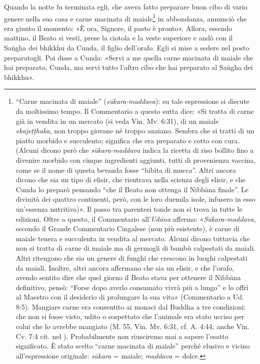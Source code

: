 Quando la notte fu terminata egli, che aveva fatto preparare buon cibo di vario
genere nella sua casa e carne macinata di maiale\footnote{“Carne macinata di
  maiale” (\emph{sūkara-maddava}): su tale espressione si discute da moltissimo
  tempo. Il Commentario a questo sutta dice: «Si tratta di carne già in vendita
  in un mercato (si veda Vin. Mv. 6:31), di un maiale \emph{ekajeṭṭhaka}, non
  troppo giovane né troppo anziano. Sembra che si tratti di un piatto morbido e
  succulento; significa che era preparato e cotto con cura. (Alcuni dicono però
  che \emph{sūkara-maddava} indica la ricetta di riso bollito fino a divenire
  morbido con cinque ingredienti aggiunti, tutti di provenienza vaccina, come se
  il nome di questa bevanda fosse “bibita di mucca”. Altri ancora dicono che sia
  un tipo di elisir, che rientrava nella scienza degli elisir, e che Cunda lo
  preparò pensando “che il Beato non ottenga il Nibbāna finale”. Le divinità dei
  quattro continenti, però, con le loro duemila isole, infusero in esso
  un’essenza nutritiva)». Il passo tra parentesi tonde non si trova in tutte le
  edizioni. Oltre a questo, il Commentario all’\emph{Udāna} afferma:
  «\emph{Sūkara-maddava}, secondo il Grande Commentario Cingalese (non più
  esistente), è carne di maiale tenera e succulenta in vendita al mercato.
  Alcuni dicono tuttavia che non si tratta di carne di maiale ma di germogli di
  bambù calpestati da maiali. Altri ritengono che sia un genere di funghi che
  crescono in luoghi calpestati da maiali. Inoltre, altri ancora affermano che
  sia un elisir, e che l’orafo, avendo sentito dire che quel giorno il Beato
  stava per ottenere il Nibbāna definitivo, pensò: “Forse dopo averlo consumato
  vivrà più a lungo” e lo offrì al Maestro con il desiderio di prolungare la sua
  vita» (Commentario a Ud. 8:5). Mangiare carne era consentito ai monaci dal
  Buddha a tre condizioni: che non si fosse visto, udito o sospettato che
  l’animale era stato ucciso per colui che lo avrebbe mangiato (M. 55, Vin. Mv.
  6:31, cf. A. 4:44; anche Vin. Cv. 7:4 cit. nel
  \hyperlink{cap-13-Devadatta#pag298}{}). Probabilmente non riusciremo mai a
  sapere l’esatto significato. È stato scelto “carne macinata di maiale” perché
  elusivo e vicino all’espressione originale: \emph{sūkara} = maiale;
  \emph{maddava} = dolce.} in abbondanza, annunciò che era giunto il momento: «È
ora, Signore, il pasto è pronto». Allora, essendo mattino, il Beato si vestì,
prese la ciotola e la veste superiore e andò con il Saṅgha dei bhikkhu da Cunda,
il figlio dell’orafo. Egli si mise a sedere nel posto preparatogli. Poi disse a
Cunda: «Servi a me quella carne macinata di maiale che hai preparato, Cunda, ma
servi tutto l’altro cibo che hai preparato al Saṅgha dei bhikkhu».

